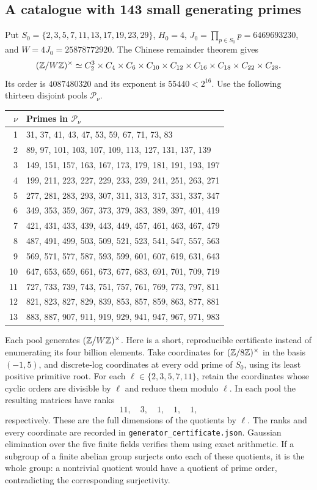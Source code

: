 \documentclass[11pt]{article}
\theoremstyle{definition}
\begin{document}
\subsection{A catalogue with 143 small generating primes}

Put \(S_0=\{2,3,5,7,11,13,17,19,23,29\}\),
\(H_0=4\), \(J_0=\prod_{p\in S_0}p=6469693230\), and
\(W=4J_0=25878772920\). The Chinese remainder theorem gives
\[
 (\mathbb Z/W\mathbb Z)^\times\simeq
 C_2^3\times C_4\times C_6\times C_{10}\times C_{12}
                  \times C_{16}\times C_{18}\times C_{22}\times C_{28}.
\]
Its order is \(4087480320\) and its exponent is \(55440<2^{16}\).
Use the following thirteen disjoint pools \(\mathcal P_\nu\).
\begin{center}\small
\begin{tabular}{r l}
\toprule
\(\nu\)& Primes in \(\mathcal P_\nu\)\\
\midrule
1&31, 37, 41, 43, 47, 53, 59, 67, 71, 73, 83\\
2&89, 97, 101, 103, 107, 109, 113, 127, 131, 137, 139\\
3&149, 151, 157, 163, 167, 173, 179, 181, 191, 193, 197\\
4&199, 211, 223, 227, 229, 233, 239, 241, 251, 263, 271\\
5&277, 281, 283, 293, 307, 311, 313, 317, 331, 337, 347\\
6&349, 353, 359, 367, 373, 379, 383, 389, 397, 401, 419\\
7&421, 431, 433, 439, 443, 449, 457, 461, 463, 467, 479\\
8&487, 491, 499, 503, 509, 521, 523, 541, 547, 557, 563\\
9&569, 571, 577, 587, 593, 599, 601, 607, 619, 631, 643\\
10&647, 653, 659, 661, 673, 677, 683, 691, 701, 709, 719\\
11&727, 733, 739, 743, 751, 757, 761, 769, 773, 797, 811\\
12&821, 823, 827, 829, 839, 853, 857, 859, 863, 877, 881\\
13&883, 887, 907, 911, 919, 929, 941, 947, 967, 971, 983\\
\bottomrule
\end{tabular}
\end{center}

Each pool generates \((\mathbb Z/W\mathbb Z)^\times\). Here is a short,
reproducible certificate instead of enumerating its four billion
elements. Take coordinates for \((\mathbb Z/8\mathbb Z)^\times\) in the
basis \((-1,5)\), and discrete-log coordinates at every odd prime
of \(S_0\), using its least positive primitive root. For each
\(\ell\in\{2,3,5,7,11\}\), retain the coordinates whose cyclic
orders are divisible by \(\ell\) and reduce them modulo \(\ell\).
In each pool the resulting matrices have ranks
\[
               11,\quad3,\quad1,\quad1,\quad1,
\]
respectively. These are the full dimensions of the quotients by
\(\ell\). The ranks and every coordinate are recorded in
\texttt{generator\_certificate.json}. Gaussian elimination over the
five finite fields verifies them using exact arithmetic. If a subgroup
of a finite abelian group surjects onto each of these quotients, it is
the whole group: a nontrivial quotient would have a quotient of prime
order, contradicting the corresponding surjectivity.
\end{document}

